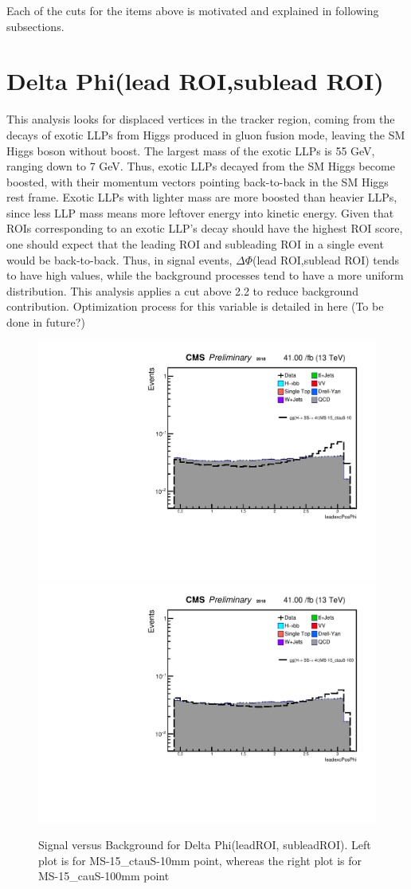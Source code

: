 Each of the cuts for the items above is motivated and explained in following subsections.

\section{Delta Phi(lead ROI,sublead ROI)}\label{sec:DeltaPhi}
This analysis looks for displaced vertices in the tracker region, coming from the decays of exotic LLPs from Higgs produced in gluon fusion mode, leaving the SM Higgs boson without boost.
The largest mass of the exotic LLPs is 55 GeV, ranging down to 7 GeV. 
Thus, exotic LLPs decayed from the SM Higgs become boosted, with their momentum vectors pointing back-to-back in the SM Higgs rest frame. 
Exotic LLPs with lighter mass are more boosted than heavier LLPs, since less LLP mass means more leftover energy into kinetic energy.
Given that ROIs corresponding to an exotic LLP's decay should have the highest ROI score, one should expect that the leading ROI and subleading ROI in a single event would be back-to-back.
Thus, in signal events, $\Delta\Phi$(lead ROI,sublead ROI) tends to have high values, while the background processes tend to have a more uniform distribution.
This analysis applies a cut above 2.2 to reduce background contribution. 
Optimization process for this variable is detailed in here (To be done in future?)


 \begin{figure}[h!]
   \caption{Signal versus Background for Delta Phi(leadROI, subleadROI). Left plot is for MS-15\_ctauS-10mm point, whereas the right plot is for MS-15\_cauS-100mm point}
   \label{fig:leadexcPosPhi}
   \centering
   \includegraphics[width=0.47\linewidth]{figs/AnalysisNoteplot_MS-15_ctauS-10_leadexcPosPhi.pdf}
   \includegraphics[width=0.47\linewidth]{figs/AnalysisNoteplot_MS-15_ctauS-100_leadexcPosPhi.pdf}
 \end{figure}








